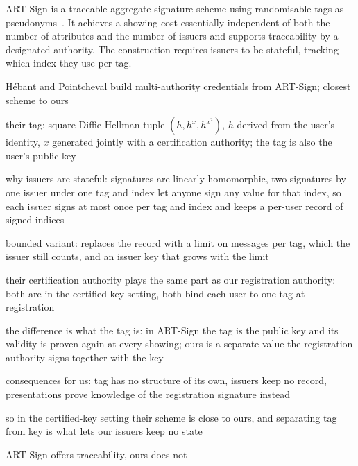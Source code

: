 ART-Sign is a traceable aggregate signature scheme using randomisable tags as
pseudonyms~\cite{SCN:HebPoi22}. It achieves a showing cost essentially
independent of both the number of attributes and the number of issuers and
supports traceability by a designated authority. The construction requires
issuers to be stateful, tracking which index they use per tag.
\begin{outline}
  \item H\'ebant and Pointcheval build multi-authority credentials from ART-Sign; closest scheme to ours
  \item their tag: square Diffie-Hellman tuple $(h, h^x, h^{x^2})$, $h$ derived from the user's identity, $x$ generated jointly with a certification authority; the tag is also the user's public key
  \item why issuers are stateful: signatures are linearly homomorphic, two signatures by one issuer under one tag and index let anyone sign any value for that index, so each issuer signs at most once per tag and index and keeps a per-user record of signed indices
  \item bounded variant: replaces the record with a limit on messages per tag, which the issuer still counts, and an issuer key that grows with the limit
\end{outline}

\begin{outline}
  \item their certification authority plays the same part as our registration authority: both are in the certified-key setting, both bind each user to one tag at registration
  \item the difference is what the tag is: in ART-Sign the tag is the public key and its validity is proven again at every showing; ours is a separate value the registration authority signs together with the key
  \item consequences for us: tag has no structure of its own, issuers keep no record, presentations prove knowledge of the registration signature instead
  \item so in the certified-key setting their scheme is close to ours, and separating tag from key is what lets our issuers keep no state
  \item ART-Sign offers traceability, ours does not
\end{outline}

